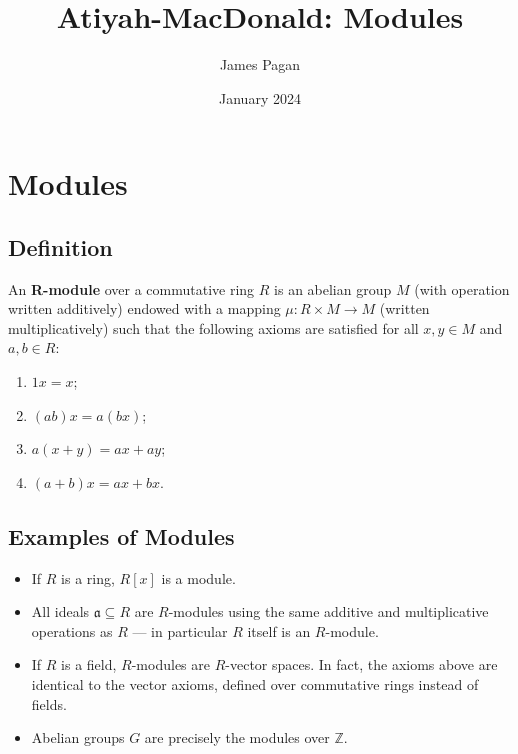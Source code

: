\documentclass[11pt]{article}
\title{Atiyah-MacDonald: Modules}
\author{James Pagan}
\date{January 2024}
\begin{document}
\maketitle
\tableofcontents

\newpage


\section{Modules}


\subsection{Definition}

An \textbf{R-module} over a commutative ring $R$ is an abelian group $M$ (with operation written additively) endowed with a mapping $\mu : R \times M \to M$ (written multiplicatively) such that the following axioms are satisfied for all $x, y \in M$ and $a, b \in R$:
\begin{enumerate}
	\item $1x = x$;
	\item $(ab)x = a(bx)$;
	\item $a(x + y) = ax + ay$;
	\item $(a + b)x = ax + bx$.
\end{enumerate}


\subsection{Examples of Modules}

\begin{itemize}
	\item If $R$ is a ring, $R[x]$ is a module.
	\item All ideals $\mathfrak{a} \subseteq R$ are $R$-modules using the same additive and multiplicative operations as $R$ --- in particular $R$ itself is an $R$-module.
	\item If $R$ is a field, $R$-modules are $R$-vector spaces. In fact, the axioms above are identical to the vector axioms, defined over commutative rings instead of fields.
	\item Abelian groups $G$ are precisely the modules over $\mathbb{Z}$.
\end{itemize}
\end{document}
